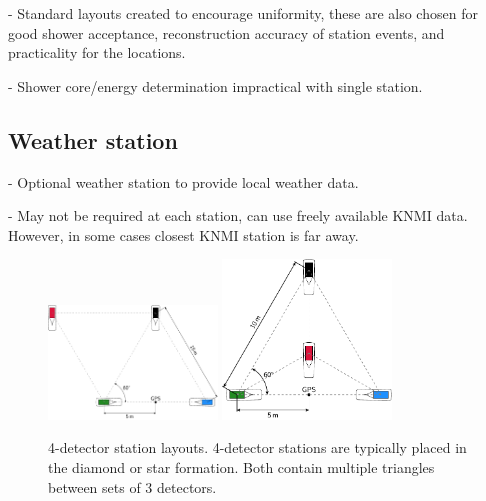 - Standard layouts created to encourage uniformity, these are also chosen for good shower acceptance, reconstruction accuracy of station events, and practicality for the locations.

- Shower core/energy determination impractical with single station.

\subsection{Weather station}


- Optional weather station to provide local weather data.

- May not be required at each station, can use freely available KNMI data. However, in some cases closest KNMI station is far away.


\begin{figure}
    \centering
    \includegraphics[width=0.4\textwidth]
                    {plots/experiment/4_detector_diamond}
    \includegraphics[width=0.4\textwidth]
                    {plots/experiment/4_detector_star}
    \caption{4-detector station layouts. 4-detector stations are typically placed in the diamond or star formation. Both contain multiple triangles between sets of 3 detectors.}
    \label{fig:4_detector_star}
\end{figure}


